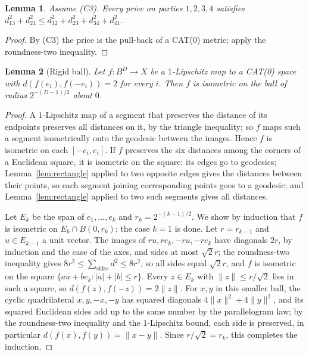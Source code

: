 \documentclass[11pt,a4paper]{article}
\newtheorem{lemma}{Lemma}[section]
\theoremstyle{definition}
\newcommand{\CS}{\textup{C3}}
\begin{document}
\begin{lemma}\label{lem:fourpoint}
Assume (\CS). Every price on parties $1,2,3,4$ satisfies
$d_{13}^2+d_{24}^2\le d_{12}^2+d_{23}^2+d_{34}^2+d_{41}^2$.
\end{lemma}

\begin{proof}
By (\CS) the price is the pull-back of a CAT(0) metric; apply the roundness-two
inequality.
\end{proof}

\begin{lemma}[Rigid ball]\label{lem:rigid}
Let $f\colon B^D\to X$ be a $1$-Lipschitz map to a CAT(0) space with
$d(f(e_i),f(-e_i))=2$ for every $i$. Then $f$ is isometric on the ball of
radius $2^{-(D-1)/2}$ about $0$.
\end{lemma}

\begin{proof}
A $1$-Lipschitz map of a segment that preserves the distance of its endpoints
preserves all distances on it, by the triangle inequality; so $f$ maps such a
segment isometrically onto the geodesic between the images. Hence $f$ is
isometric on each $[-e_i,e_i]$. If $f$ preserves the six distances among the
corners of a Euclidean square, it is isometric on the square: its edges go to
geodesics; Lemma~\ref{lem:rectangle} applied to two opposite edges gives the
distances between their points, so each segment joining corresponding points
goes to a geodesic; and Lemma~\ref{lem:rectangle} applied to two such segments
gives all distances.

Let $E_k$ be the span of $e_1,\dots,e_k$ and $r_k=2^{-(k-1)/2}$. We show by
induction that $f$ is isometric on $E_k\cap B(0,r_k)$; the case $k=1$ is done.
Let $r=r_{k-1}$ and $u\in E_{k-1}$ a unit vector. The images of $ru,re_k,-ru,
-re_k$ have diagonals $2r$, by induction and the case of the axes, and sides at
most $\sqrt2r$; the roundness-two inequality gives
$8r^2\le\sum_{\text{sides}}d^2\le8r^2$, so all sides equal $\sqrt2r$, and $f$ is
isometric on the square $\{au+be_k:|a|+|b|\le r\}$. Every $z\in E_k$ with
$\|z\|\le r/\sqrt2$ lies in such a square, so $d(f(z),f(-z))=2\|z\|$. For $x,y$ in
this smaller ball, the cyclic quadrilateral $x,y,-x,-y$ has squared diagonals
$4\|x\|^2+4\|y\|^2$, and its squared Euclidean sides add up to the same number by
the parallelogram law; by the roundness-two inequality and the $1$-Lipschitz
bound, each side is preserved, in particular $d(f(x),f(y))=\|x-y\|$. Since
$r/\sqrt2=r_k$, this completes the induction.
\end{proof}
\end{document}
